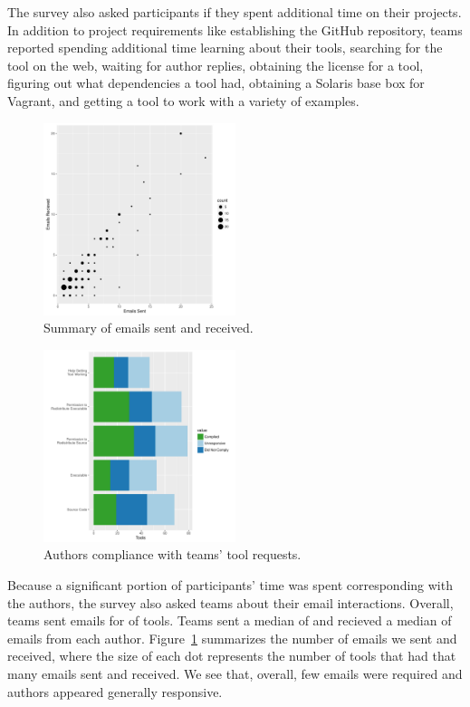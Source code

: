 \documentclass{sig-alternate-05-2015}
\begin{document}

The survey also asked participants if they spent
additional time on their projects.
In addition to project requirements like establishing
the GitHub repository, teams 
reported spending additional time 
learning about their tools,
searching for the tool on the web,
waiting for author replies,
obtaining the license for a tool,
figuring out what dependencies a tool had,
obtaining a Solaris base box for Vagrant,
and
getting a tool to work with a variety of examples.

\begin{figure}[!ht]
  \centering
    \includegraphics[width=0.5\textwidth]{emailPlot.pdf}
  \caption{Summary of emails sent and received.}\label{fig:emailSnR}
\end{figure}

\begin{figure}[!ht]
  \centering
    \includegraphics[width=0.5\textwidth]{requestPlot.pdf}
  \caption{Authors compliance with teams' tool requests.}\label{fig:requests}
\end{figure}

Because a significant portion of participants' time was
spent corresponding with the authors,
the survey also asked teams about their email interactions.
Overall, teams sent emails for \emailsPercentSent of tools.
Teams sent a median of \emailsSent and recieved 
a median of \emailsRecieved emails from each author.
Figure~\ref{fig:emailSnR} summarizes the number of emails
we sent and received, where the size of each dot
represents the number of tools that had
that many emails sent and received.
We see that, overall, few emails were required
and authors appeared generally responsive.
\end{document}
